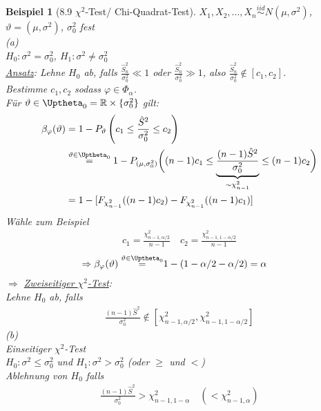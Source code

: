 \documentclass[a4paper,openany]{book}
\theoremstyle{mytheoremstyle}
\newtheorem*{bei}{Beispiel}
\theoremstyle{mytheoremstyle2}
\begin{document}
\begin{bei}[8.9 $\chi ^2$-Test/ Chi-Quadrat-Test]
  $X_1,X_2,...,X_n \overset{iid}\sim N(\mu ,\sigma ^2)$, $\vartheta =(\mu ,\sigma ^2)$, $\sigma _0^2$ fest   \\
  (a) \\
  $H_0:\sigma ^2=\sigma _0^2$, $H_1:\sigma ^2 \neq \sigma _0^2$  \\
  \underline{Ansatz}: Lehne $H_0$ ab, falls $\frac{\hat{S}_n^2}{\sigma _0^2}\ll1$ oder $\frac{\hat{S}_n^2}{\sigma _0^2}\gg 1$, also $\frac{\hat{S}_n^2}{\sigma _0^2}\notin [c_1,c_2]$. \\
  Bestimme $c_1,c_2$ sodass $\varphi \in \Phi _{\alpha }$. \\
  Für $\vartheta \in \Uptheta_0=\mathbb{R}\times \{\sigma _0^2\}$ gilt: 
  \begin{align*}
    \beta _{\varphi }(\vartheta )
    &=1- P _{\vartheta }\left(c_1 \leq \frac{\hat{S}^2}{\sigma _0^2}\leq c_2\right)\\
    &\overset{\vartheta \in \Uptheta_0}=1-P _{(\mu ,\sigma _0   ^2)}\bigg((n-1)c_1 \leq \underbrace{\frac{(n-1)\hat{S}^2}{\sigma _0^2}}_{\sim \chi _{n-1}^2}\leq (n-1)c_2\bigg)\\
    &=1-[F _{\chi _{n-1}^2}((n-1)c_2)-F _{\chi _{n-1}^2}((n-1)c_1)]
  \end{align*}
  Wähle zum Beispiel 
  \begin{align*}
    c_1=\frac{\chi _{n-1,\alpha /2}^2}{n-1}\quad c_2=\frac{\chi _{n-1,1-\alpha /2}^2}{n-1}
  \end{align*}
  \begin{align*}
    \Rightarrow \beta _{\varphi }(\vartheta )\overset{\vartheta \in \Uptheta_0}
    =&1-(1-\alpha /2-\alpha /2)=\alpha 
  \end{align*}
  $\Rightarrow $ \underline{Zweiseitiger $\chi ^2$-Test}: \\
  Lehne $H_0$ ab, falls 
  \begin{align*}
    \frac{(n-1)\hat{S}^2}{\sigma _0^2}\notin \left[\chi _{n-1,\alpha /2}^2,\chi _{n-1,1-\alpha /2}^2\right]
  \end{align*}
  (b)\\
  Einseitiger $\chi ^2$-Test \\
  $H_0:\sigma ^2 \leq \sigma _0^2$ und $H_1:\sigma ^2>\sigma _0^2$  (oder $\geq $ und $<$)\\
  Ablehnung von $H_0$ falls  
  \begin{align*}
    \frac{(n-1)\hat{S}^2}{\sigma _0^2}>\chi _{n-1,1-\alpha }^2\quad(<\chi _{n-1,\alpha }^2)
  \end{align*}
\end{bei}
\end{document}
